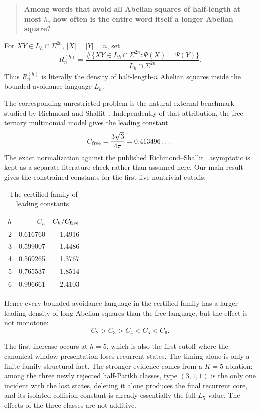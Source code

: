 \documentclass[12pt]{article}
\theoremstyle{definition}
\begin{document}
\begin{quote}
\textbf{Among words that avoid all Abelian squares of half-length at most \(h\), how often is the entire word itself a longer Abelian square?}
\end{quote}

For \(XY\in L_h\cap\Sigma^{2n}\), \(|X|=|Y|=n\), set
\begin{equation}\label{eq:Rn}
R_n^{(h)}
=
\frac{
\#\{XY\in L_h\cap\Sigma^{2n}:\Psi(X)=\Psi(Y)\}
}{
|L_h\cap\Sigma^{2n}|
}.
\end{equation}
Thus \(R_n^{(h)}\) is literally the density of half-length-\(n\) Abelian squares inside the bounded-avoidance language \(L_h\).

The corresponding unrestricted problem is the natural external benchmark studied by Richmond and Shallit~\cite{Richmond2009}. Independently of that attribution, the free ternary multinomial model gives the leading constant
\[
C_{\rm free}
=
\frac{3\sqrt3}{4\pi}
=
0.413496\ldots.
\]
The exact normalization against the published Richmond--Shallit~\cite{Richmond2009} asymptotic is kept as a separate literature check rather than assumed here.
Our main result gives the constrained constants for the first five nontrivial cutoffs:

\begin{table}[h]
\centering
\begin{tabular}{rrr}
\toprule
\(h\) & \(C_h\) & \(C_h/C_{\rm free}\) \\
\midrule
2 & 0.616760 & 1.4916 \\
3 & 0.599007 & 1.4486 \\
4 & 0.569265 & 1.3767 \\
5 & 0.765537 & 1.8514 \\
6 & 0.996661 & 2.4103 \\
\bottomrule
\end{tabular}
\caption{The certified family of leading constants.}
\label{tab:family}
\end{table}

Hence every bounded-avoidance language in the certified family has a larger leading density of long Abelian squares than the free language, but the effect is not monotone:
\[
\boxed{C_2>C_3>C_4<C_5<C_6.}
\]

The first increase occurs at \(h=5\), which is also the first cutoff where the canonical window presentation loses recurrent states. The timing alone is only a finite-family structural fact. The stronger evidence comes from a \(K=5\) ablation: among the three newly rejected half-Parikh classes, type \((3,1,1)\) is the only one incident with the lost states, deleting it alone produces the final recurrent core, and its isolated collision constant is already essentially the full \(L_5\) value. The effects of the three classes are not additive.
\end{document}
